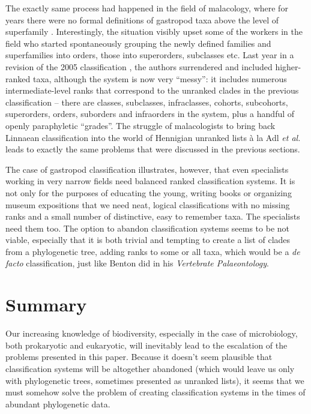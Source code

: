 \begin{artengenv}
The exactly same process had happened in the field of malacology, where for years there were no formal definitions of
gastropod taxa above the level of superfamily
\parencite[see][]{bouchet_classification_2005}.
Interestingly,
the situation visibly upset some of the workers in the field who started spontaneously grouping the newly defined
families and superfamilies into orders, those into superorders, subclasses etc. Last year in a revision of the 2005
classification
\parencite{bouchet_revised_2017},
the authors surrendered and included higher-ranked
taxa, although the system is now very ``messy'': it includes numerous intermediate-level ranks that correspond to the
unranked clades in the previous classification -- there are classes, subclasses, infraclasses, cohorts, subcohorts,
superorders, orders, suborders and infraorders in the system, plus a handful of openly paraphyletic ``grades''. The
struggle of malacologists to bring back Linnaean classification into the world of Hennigian unranked lists à la Adl
\textit{et al.} leads to exactly the same problems that were discussed in the previous sections.

The case of gastropod classification illustrates, however, that even specialists working in very narrow fields need
balanced ranked classification systems. It is not only for the purposes of educating the young, writing books or
organizing museum expositions that we need neat, logical classifications with no missing ranks and a small number of
distinctive, easy to remember taxa. The specialists need them too. The option to abandon classification systems seems
to be not viable, especially that it is both trivial and tempting to create a list of clades from a phylogenetic tree,
adding ranks to some or all taxa, which would be a \textit{de facto} classification, just like Benton did in his
\textit{Vertebrate Palaeontology}.

\section{Summary}

Our increasing knowledge of biodiversity, especially in the case of microbiology, both prokaryotic and eukaryotic, will
inevitably lead to the escalation of the problems presented in this paper. Because it doesn’t seem plausible that
classification systems will be altogether abandoned (which would leave us only with phylogenetic trees, sometimes
presented as unranked lists), it seems that we must somehow solve the problem of creating classification systems in the
times of abundant phylogenetic data.


\end{artengenv}
